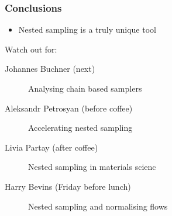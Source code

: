 \documentclass[aspectratio=169,handout]{beamer}
\begin{document}
\begin{frame}
    \frametitle{Conclusions}
    \begin{itemize}
        \item Nested sampling is a truly unique tool
    \end{itemize}
    \begin{block}{Watch out for:}
        \begin{description}
            \item[Johannes Buchner (next)] Analysing chain based samplers
            \item[Aleksandr Petrosyan (before coffee)] Accelerating nested sampling
            \item[Livia Partay (after coffee)] Nested sampling in materials scienc
            \item[Harry Bevins (Friday before lunch)] Nested sampling and normalising flows
        \end{description}
    \end{block}
\end{frame}

\appendix
\end{document}
